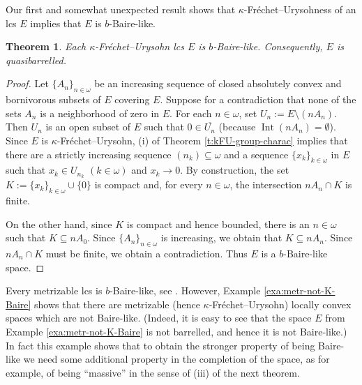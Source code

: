 \documentclass[preprint,11pt]{elsarticle}
\newtheorem{theorem}{Theorem}[section]
\theoremstyle{definition}
\theoremstyle{remark}
\numberwithin{equation}{section}
\numberwithin{theorem}{section}
\newcommand{\w}{\omega}
\newcommand{\Int}{\mathsf{Int}}
\newcommand{\SM}{{\setminus}}
\def\Int{\operatorname{Int}}
\begin{document}

Our first and somewhat unexpected result shows that $\kappa$-Fr\'{e}chet--Urysohness of an lcs $E$ implies that $E$ is $b$-Baire-like.
\begin{theorem} \label{t:kFU=>b-Baire-like}
Each $\kappa$-Fr\'{e}chet--Urysohn lcs $E$ is $b$-Baire-like. Consequently, $E$ is quasibarrelled.
\end{theorem}

\begin{proof}
Let $\{A_n\}_{n\in\w}$ be an increasing sequence of closed absolutely convex and bornivorous subsets of $E$ covering $E$. Suppose for a contradiction that none of the sets $A_n$ is a neighborhood of zero in $E$. For each $n\in\w$, set $U_n:=E\SM (nA_n)$. Then $U_n$ is an open subset of $E$ such that $0\in \overline{U_n}$ (because $\Int(nA_n)=\emptyset$). Since  $E$ is $\kappa$-Fr\'{e}chet--Urysohn, (i) of Theorem \ref{t:kFU-group-charac} implies that there are a strictly increasing sequence $(n_k)\subseteq \w$ and a sequence $\{x_k\}_{k\in\w}$ in $E$ such that $x_k\in U_{n_k}$ $(k\in\w)$ and $x_k\to 0$.
By construction, the set $K:=\{x_k\}_{k\in\w}\cup\{0\}$ is compact and, for every $n\in\w$, the intersection $nA_n\cap K$ is finite.

On the other hand, since $K$ is compact and hence bounded, there is an $n\in\w$ such that $K\subseteq nA_0$. Since $\{A_n\}_{n\in\w}$ is increasing, we obtain that $K\subseteq nA_n$. Since $nA_n\cap K$ must be finite, we obtain a contradiction. Thus $E$  is a $b$-Baire-like space.
\end{proof}


Every metrizable lcs is $b$-Baire-like, see \cite[Proposition~2.11]{kak}. However, Example \ref{exa:metr-not-K-Baire} shows that there are metrizable (hence $\kappa$-Fr\'{e}chet--Urysohn) locally convex spaces which are not Baire-like. (Indeed, it is easy to see that the space $E$ from Example \ref{exa:metr-not-K-Baire} is not barrelled, and hence it is not Baire-like.) In fact this example shows that to obtain the stronger property of being Baire-like we need some additional property in the completion of the space, as for example, of being ``massive'' in the sense of (iii) of the next theorem.
\end{document}
